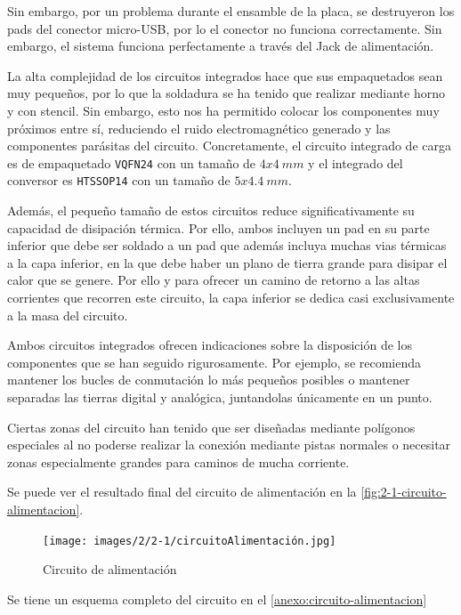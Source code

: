 Sin embargo, por un problema durante el ensamble de la placa, se destruyeron los pads del conector micro-USB, por lo el conector no funciona correctamente. Sin embargo, el sistema funciona perfectamente a través del Jack de alimentación.

La alta complejidad de los circuitos integrados hace que sus empaquetados sean muy pequeños, por lo que la soldadura se ha tenido que realizar mediante horno y con stencil. Sin embargo, esto nos ha permitido colocar los componentes muy próximos entre sí, reduciendo el ruido electromagnético generado y las componentes parásitas del circuito. Concretamente, el circuito integrado de carga es de empaquetado \texttt{VQFN24} con un tamaño de $4x4\ mm$ y el integrado del conversor es \texttt{HTSSOP14} con un tamaño de $5x4.4\ mm$.

Además, el pequeño tamaño de estos circuitos reduce significativamente su capacidad de disipación térmica. Por ello, ambos incluyen un pad en su parte inferior que debe ser soldado a un pad que además incluya muchas vias térmicas a la capa inferior, en la que debe haber un plano de tierra grande para disipar el calor que se genere. Por ello y para ofrecer un camino de retorno a las altas corrientes que recorren este circuito, la capa inferior se dedica casi exclusivamente a la masa del circuito. 

Ambos circuitos integrados ofrecen indicaciones sobre la disposición de los componentes que se han seguido rigurosamente. Por ejemplo, se recomienda mantener los bucles de conmutación lo más pequeños posibles o mantener separadas las tierras digital y analógica, juntandolas únicamente en un punto. 

Ciertas zonas del circuito han tenido que ser diseñadas mediante polígonos especiales al no poderse realizar la conexión mediante pistas normales o necesitar zonas especialmente grandes para caminos de mucha corriente.

Se puede ver el resultado final del circuito de alimentación en la \autoref{fig:2-1-circuito-alimentacion}.

\begin{figure}[h]
    \centering
    \texttt{[image: images/2/2-1/circuitoAlimentación.jpg]}
    \caption{Circuito de alimentación}
    \label{fig:2-1-circuito-alimentacion}
\end{figure}

Se tiene un esquema completo del circuito en el \autoref{anexo:circuito-alimentacion}